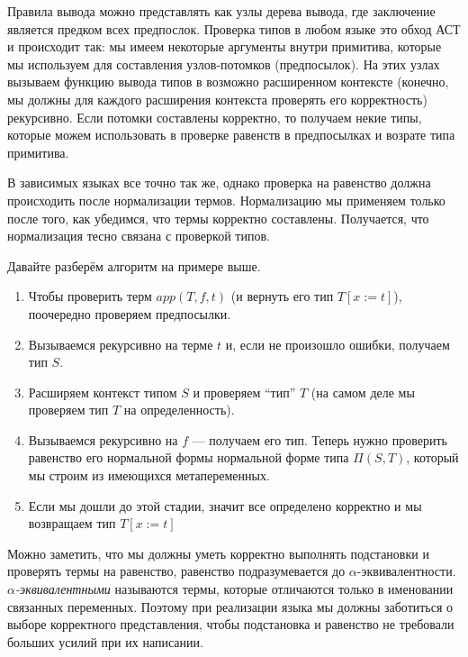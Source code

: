 Правила вывода можно представлять как узлы дерева вывода, где заключение является предком всех предпослок. Проверка типов в любом языке это обход АСТ и происходит так: мы имеем некоторые аргументы внутри примитива, которые мы используем для составления узлов-потомков (предпосылок). На этих узлах вызываем функцию вывода типов в возможно расширенном контексте (конечно, мы должны для каждого расширения контекста проверять его корректность) рекурсивно. Если потомки составлены корректно, то получаем некие типы, которые можем использовать в проверке равенств в предпосылках и возрате типа примитива.

В зависимых языках все точно так же, однако проверка на равенство должна происходить после нормализации термов. Нормализацию мы применяем только после того, как убедимся, что термы корректно составлены. Получается, что нормализация тесно связана с проверкой типов.

Давайте разберём алгоритм на примере выше.
\begin{enumerate}
\item Чтобы проверить терм $app(T, f, t)$ (и вернуть его тип $T[x:=t]$), поочередно проверяем предпосылки.
\item Вызываемся рекурсивно на терме $t$ и, если не произошло ошибки, получаем тип $S$.
\item Расширяем контекст типом $S$ и проверяем ``тип'' $T$ (на самом деле мы проверяем тип $T$ на определенность).
\item Вызываемся рекурсивно на $f$ --- получаем его тип. Теперь нужно проверить равенство его нормальной формы нормальной форме типа $\Pi(S, T)$, который мы строим из имеющихся метапеременных.
\item Если мы дошли до этой стадии, значит все определено корректно и мы возвращаем тип $T[x:=t]$
\end{enumerate}

Можно заметить, что мы должны уметь корректно выполнять подстановки и проверять термы на равенство, равенство подразумевается до $\alpha$-эквивалентности. \textit{$\alpha$-эквивалентными} называются термы, которые отличаются только в именовании связанных переменных. Поэтому при реализации языка мы должны заботиться о выборе корректного представления, чтобы подстановка и равенство не требовали больших усилий при их написании.





